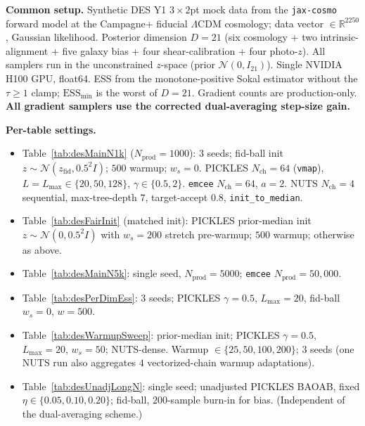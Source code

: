 \documentclass{article}
\newcommand{\R}{\mathbb{R}}
\newcommand{\gN}{\mathcal{N}}
\begin{document}
\textbf{Common setup.} Synthetic DES Y1 $3\times 2$pt mock data from the
\texttt{jax-cosmo} forward model at the Campagne+ fiducial $\Lambda$CDM
cosmology; data vector $\in\R^{2250}$, Gaussian likelihood. Posterior
dimension $D=21$ (six cosmology + two intrinsic-alignment + five galaxy
bias + four shear-calibration + four photo-$z$). All samplers run in the
unconstrained $z$-space (prior $\gN(0,I_{21})$). Single NVIDIA H100 GPU,
float64. ESS from the monotone-positive Sokal estimator without the
$\tau\!\ge\!1$ clamp; $\text{ESS}_{\min}$ is the worst of $D=21$.
Gradient counts are production-only. \textbf{All gradient samplers use
the corrected dual-averaging step-size gain.}

\textbf{Per-table settings.}
\begin{itemize}\setlength\itemsep{2pt}
\item Table~\ref{tab:desMainN1k} ($N_{\text{prod}}=1000$): 3 seeds;
fid-ball init $z\sim\gN(z_{\text{fid}},0.5^2I)$; $500$ warmup; $w_s=0$.
PICKLES $N_{\text{ch}}=64$ (\texttt{vmap}), $L=L_{\max}\in\{20,50,128\}$,
$\gamma\in\{0.5,2\}$. \texttt{emcee} $N_{\text{ch}}=64$, $a=2$. NUTS
$N_{\text{ch}}=4$ sequential, max-tree-depth $7$, target-accept $0.8$,
\texttt{init\_to\_median}.
\item Table~\ref{tab:desFairInit} (matched init): PICKLES prior-median
init $z\sim\gN(0,0.5^2I)$ with $w_s=200$ stretch pre-warmup; $500$
warmup; otherwise as above.
\item Table~\ref{tab:desMainN5k}: single seed, $N_{\text{prod}}=5000$;
\texttt{emcee} $N_{\text{prod}}=50{,}000$.
\item Table~\ref{tab:desPerDimEss}: 3 seeds; PICKLES $\gamma=0.5$,
$L_{\max}=20$, fid-ball $w_s=0$, $w=500$.
\item Table~\ref{tab:desWarmupSweep}: prior-median init; PICKLES
$\gamma=0.5$, $L_{\max}=20$, $w_s=50$; NUTS-dense. Warmup
$\in\{25,50,100,200\}$; $3$ seeds (one NUTS run also aggregates $4$
vectorized-chain warmup adaptations).
\item Table~\ref{tab:desUnadjLongN}: single seed; unadjusted PICKLES
BAOAB, fixed $\eta\in\{0.05,0.10,0.20\}$; fid-ball, $200$-sample
burn-in for bias. (Independent of the dual-averaging scheme.)
\end{itemize}
\end{document}
